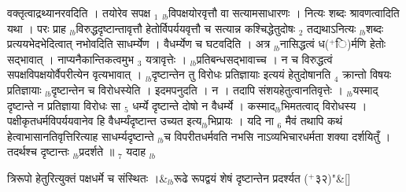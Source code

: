 \documentclass[article,12pt,a4paper]{memoir}%
\newcommand{\add}[1]{($^{+}$#1)}
\begin{document}
वक्तृत्वाद्रथ्यानरवदिति । तयोरेव सपक्ष {\tiny $_{1}$} {\tiny $_{lb}$}विपक्षयोरवृत्तौ वा सत्यामसाधारणः । नित्यः शब्दः श्रावणत्वादिति यथा । परः प्राह {\tiny $_{lb}$}विरुद्धदृष्टान्तावृत्तौ हेतोर्विपर्ययवृत्तौ च सत्यान्न कश्चिद्धेतुदोषः {\tiny $_{2}$} तद्यथाऽनित्यः {\tiny $_{lb}$}शब्दः प्रत्ययभेदभेदित्वात् नभोवदिति साधर्म्येण । वैधर्म्येण च घटवदिति । अत्र {\tiny $_{lb}$}नासिद्धत्वं ध\add{ि}र्मणि हेतोः सद्भावात् । नाप्यनैकान्तिकत्वमुभ {\tiny $_{3}$} यत्रावृत्तेः । {\tiny $_{lb}$}प्रतिबन्धसद्भावाच्च । न च विरुद्धत्वं सपक्षविपक्षयोर्वैपरीत्येन वृत्यभावात् । {\tiny $_{lb}$}दृष्टान्तेन तु विरोधः प्रतिज्ञायाः इत्ययं हेतुदोषानति {\tiny $_{4}$} क्रान्तो विषयः प्रतिज्ञायाः {\tiny $_{lb}$}दृष्टान्तेन च विरोधस्येति । इदमपनुदति । न । तदापि संशयहेतुत्वानतिवृत्तेः । {\tiny $_{lb}$}यस्माद् दृष्टान्ते न प्रतिज्ञाया विरोधः सा {\tiny $_{5}$} धर्म्ये दृष्टान्ते दोषो न वैधर्म्ये । कस्माद{\tiny $_{lb}$}भिमतत्वाद् विरोधस्य । पक्षीकृतधर्मविपर्ययवानेव हि वैधर्म्यंदृष्टान्त उच्यत इत्य{\tiny $_{lb}$}भिप्रायः । यदि ना {\tiny $_{6}$} मैवं तथापि कथं हेत्वाभासानतिवृत्तिरित्याह साधर्म्यदृष्टान्ते {\tiny $_{lb}$}च विपरीतधर्मवति नभसि नाऽव्यभिचारधर्मता शक्या दर्शयितुँ । तदर्थश्च दृष्टान्तः {\tiny $_{lb}$}प्रदर्शते ॥ {\tiny $_{7}$} यदाह {\tiny $_{lb}$} \leavevmode{} 
	    \pend%
	  
	    
	    \stanza[\smallbreak]
	  त्रिरूपो हेतुरित्युक्तं पक्षधर्मे च संस्थितः ।&{\tiny $_{lb}$}रूढे रूपद्वयं शेषं दृष्टान्तेन प्रदर्श्यत \add{३२}{\normalfontlatin\large\qquad{}"}\&[\smallbreak]
	  
	  
	  
\end{document}
